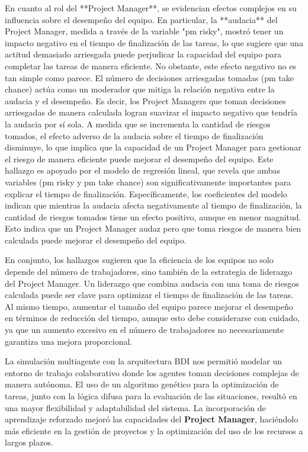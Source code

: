 \documentclass[a4paper, 12pt]{article}
\begin{document}
En cuanto al rol del **Project Manager**, se evidencian efectos complejos en su influencia sobre el desempeño del equipo. En particular, la **audacia** del Project Manager, medida a través de la variable "pm risky", mostró tener un impacto negativo en el tiempo de finalización de las tareas, lo que sugiere que una actitud demasiado arriesgada puede perjudicar la capacidad del equipo para completar las tareas de manera eficiente. No obstante, este efecto negativo no es tan simple como parece. El número de decisiones arriesgadas tomadas (pm take chance) actúa como un moderador que mitiga la relación negativa entre la audacia y el desempeño. Es decir, los Project Managers que toman decisiones arriesgadas de manera calculada logran suavizar el impacto negativo que tendría la audacia por sí sola. A medida que se incrementa la cantidad de riesgos tomados, el efecto adverso de la audacia sobre el tiempo de finalización disminuye, lo que implica que la capacidad de un Project Manager para gestionar el riesgo de manera eficiente puede mejorar el desempeño del equipo. Este hallazgo es apoyado por el modelo de regresión lineal, que revela que ambas variables (pm risky y pm take chance) son significativamente importantes para explicar el tiempo de finalización. Específicamente, los coeficientes del modelo indican que mientras la audacia afecta negativamente al tiempo de finalización, la cantidad de riesgos tomados tiene un efecto positivo, aunque en menor magnitud. Esto indica que un Project Manager audaz pero que toma riesgos de manera bien calculada puede mejorar el desempeño del equipo.

En conjunto, los hallazgos sugieren que la eficiencia de los equipos no solo depende del número de trabajadores, sino también de la estrategia de liderazgo del Project Manager. Un liderazgo que combina audacia con una toma de riesgos calculada puede ser clave para optimizar el tiempo de finalización de las tareas. Al mismo tiempo, aumentar el tamaño del equipo parece mejorar el desempeño en términos de reducción del tiempo, aunque esto debe considerarse con cuidado, ya que un aumento excesivo en el número de trabajadores no necesariamente garantiza una mejora proporcional.

La simulación multiagente con la arquitectura BDI nos permitió modelar un entorno de trabajo colaborativo donde los agentes toman decisiones complejas de manera autónoma. El uso de un algoritmo genético para la optimización de tareas, junto con la lógica difusa para la evaluación de las situaciones, resultó en una mayor flexibilidad y adaptabilidad del sistema. La incorporación de aprendizaje reforzado mejoró las capacidades del \textbf{Project Manager}, haciéndolo más eficiente en la gestión de proyectos y la optimización del uso de los recursos a largos plazos.
\end{document}
